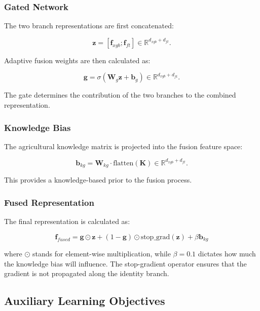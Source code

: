 \documentclass[journal]{IEEEtran}
\begin{document}
\subsubsection{Gated Network}

The two branch representations are first concatenated:

\begin{equation}
\mathbf{z} =
[\mathbf{f}_{xgb};\mathbf{f}_{ft}]
\in\mathbb{R}^{d_{xgb}+d_{ft}}.
\end{equation}

Adaptive fusion weights are then calculated as:

\begin{equation}
\mathbf{g} =
\sigma(\mathbf{W}_g\mathbf{z}+\mathbf{b}_g)
\in\mathbb{R}^{d_{xgb}+d_{ft}}.
\end{equation}

The gate determines the contribution of the two branches to the combined representation.

\subsubsection{Knowledge Bias}

The agricultural knowledge matrix is projected into the fusion feature space:

\begin{equation}
\mathbf{b}_{kg} =
\mathbf{W}_{kg}\cdot
\text{flatten}(\mathbf{K})
\in\mathbb{R}^{d_{xgb}+d_{ft}}.
\end{equation}

This provides a knowledge-based prior to the fusion process.

\subsubsection{Fused Representation}

The final representation is calculated as:

\begin{equation}
\mathbf{f}_{fused} =
\mathbf{g}\odot\mathbf{z}
+
(1-\mathbf{g})\odot
\text{stop\_grad}(\mathbf{z})
+
\beta\mathbf{b}_{kg}
\end{equation}

where $\odot$ stands for element-wise multiplication, while $\beta=0.1$ dictates how much the knowledge bias will influence. The stop-gradient operator ensures that the gradient is not propagated along the identity branch.
\subsection{Auxiliary Learning Objectives}
\end{document}
